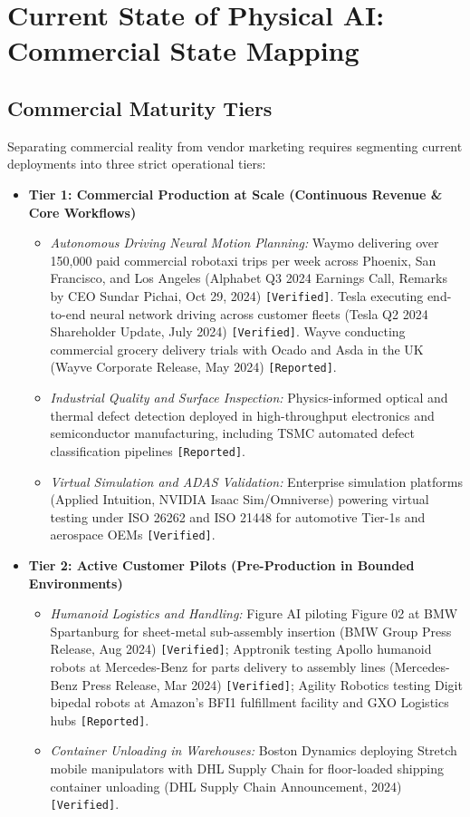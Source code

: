 \documentclass[11pt,a4paper]{article}
\begin{document}
\newpage
\section{Current State of Physical AI: Commercial State Mapping}

\subsection{Commercial Maturity Tiers}
Separating commercial reality from vendor marketing requires segmenting current deployments into three strict operational tiers:

\begin{itemize}
    \item \textbf{Tier 1: Commercial Production at Scale (Continuous Revenue \& Core Workflows)}
    \begin{itemize}
        \item \textit{Autonomous Driving Neural Motion Planning:} Waymo delivering over 150,000 paid commercial robotaxi trips per week across Phoenix, San Francisco, and Los Angeles (Alphabet Q3 2024 Earnings Call, Remarks by CEO Sundar Pichai, Oct 29, 2024) \texttt{[Verified]}. Tesla executing end-to-end neural network driving across customer fleets (Tesla Q2 2024 Shareholder Update, July 2024) \texttt{[Verified]}. Wayve conducting commercial grocery delivery trials with Ocado and Asda in the UK (Wayve Corporate Release, May 2024) \texttt{[Reported]}.
        \item \textit{Industrial Quality and Surface Inspection:} Physics-informed optical and thermal defect detection deployed in high-throughput electronics and semiconductor manufacturing, including TSMC automated defect classification pipelines \texttt{[Reported]}.
        \item \textit{Virtual Simulation and ADAS Validation:} Enterprise simulation platforms (Applied Intuition, NVIDIA Isaac Sim/Omniverse) powering virtual testing under ISO 26262 and ISO 21448 for automotive Tier-1s and aerospace OEMs \texttt{[Verified]}.
    \end{itemize}

    \item \textbf{Tier 2: Active Customer Pilots (Pre-Production in Bounded Environments)}
    \begin{itemize}
        \item \textit{Humanoid Logistics and Handling:} Figure AI piloting Figure 02 at BMW Spartanburg for sheet-metal sub-assembly insertion (BMW Group Press Release, Aug 2024) \texttt{[Verified]}; Apptronik testing Apollo humanoid robots at Mercedes-Benz for parts delivery to assembly lines (Mercedes-Benz Press Release, Mar 2024) \texttt{[Verified]}; Agility Robotics testing Digit bipedal robots at Amazon's BFI1 fulfillment facility and GXO Logistics hubs \texttt{[Reported]}.
        \item \textit{Container Unloading in Warehouses:} Boston Dynamics deploying Stretch mobile manipulators with DHL Supply Chain for floor-loaded shipping container unloading (DHL Supply Chain Announcement, 2024) \texttt{[Verified]}.
    \end{itemize}


\end{itemize}
\end{document}
